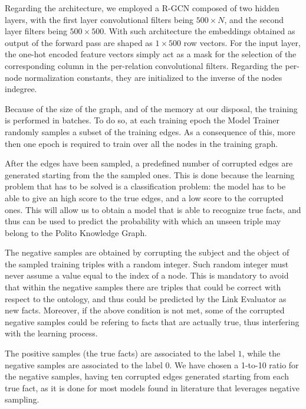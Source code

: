 \documentclass[%
    corpo=13.5pt,
    twoside,
    oldstyle,
    tipotesi=magistrale,
    greek,
    evenboxes
]{toptesi}
\begin{document}
Regarding the architecture, we employed a R-GCN composed of two hidden layers,
with the first layer convolutional filters being $500 \times N$, and the second
layer filters being $500 \times 500$.
With such architecture the embeddings obtained as output of the forward pass
are shaped as $1 \times 500$ row vectors.
For the input layer, the one-hot encoded feature vectors simply act as a mask
for the selection of the corresponding column in the per-relation convolutional
filters.
Regarding the per-node normalization constants, they are initialized to the
inverse of the nodes indegree.

Because of the size of the graph, and of the memory at our disposal, the
training is performed in batches.
To do so, at each training epoch the Model Trainer randomly samples a subset
of the training edges.
As a consequence of this, more then one epoch is required to train over all
the nodes in the training graph.

After the edges have been sampled, a predefined number of corrupted edges are
generated starting from the the sampled ones. This is done because the learning
problem that has to be solved is a classification problem: the model has to
be able to give an high score to the true edges, and a
low score to the corrupted ones.
This will allow us to obtain a model that is able to recognize true facts, and
thus can be used to predict the probability with which an unseen triple
may belong to the Polito Knowledge Graph.

The negative samples are obtained by corrupting the subject and the object
of the sampled training triples with a random integer.
Such random integer must never assume a value equal to the index of a node.
This is mandatory to avoid that within the negative samples there
are triples that could be correct with respect to the ontology, and thus could
be predicted by the Link Evaluator as new facts.
Moreover, if the above condition is not met, some of the corrupted negative
samples could be refering to facts that are actually true, thus interfering
with the learning process.

The positive samples (the true facts) are associated to the label $1$, while
the negative samples are associated to the label $0$.
We have chosen a 1-to-10 ratio for the negative samples, having ten corrupted
edges generated starting from each true fact, as it is done for most models
found in literature that leverages negative sampling.
\end{document}
